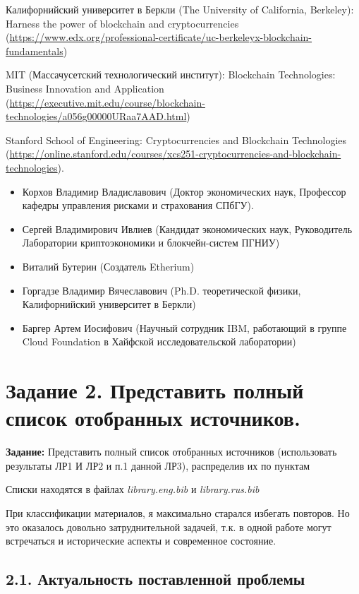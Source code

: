 \documentclass[a4paper, 12pt]{report}		%
\begin{document}
Калифорнийский университет в Беркли (The University of California, Berkeley): Harness the power of blockchain and cryptocurrencies (\url{https://www.edx.org/professional-certificate/uc-berkeleyx-blockchain-fundamentals})

MIT (Массачусетский технологический институт): Blockchain Technologies: Business Innovation and Application (\url{https://executive.mit.edu/course/blockchain-technologies/a056g00000URaa7AAD.html})

Stanford School of Engineering: Cryptocurrencies and Blockchain Technologies (\url{https://online.stanford.edu/courses/xcs251-cryptocurrencies-and-blockchain-technologies}).

\begin{itemize}
\item Корхов Владимир Владиславович (Доктор экономических наук, Профессор кафедры управления рисками и страхования СПбГУ).
\item Сергей Владимирович Ивлиев (Кандидат экономических наук, Руководитель Лаборатории криптоэкономики и блокчейн-систем ПГНИУ)
\item Виталий Бутерин (Создатель Etherium)
\item Горгадзе Владимир Вячеславович (Ph.D. теоретической физики, Калифорнийский университет в Беркли)
\item Баргер Артем Иосифович (Научный сотрудник IBM, работающий в группе Cloud Foundation в Хайфской исследовательской лаборатории)
\end{itemize}

\chapter*{Задание 2. Представить полный список отобранных источников.}

\textbf{Задание:} Представить полный список отобранных источников (использовать результаты ЛР1 И ЛР2 и п.1 данной ЛР3), распределив их по пунктам

Списки находятся в файлах \textit{library.eng.bib} и \textit{library.rus.bib}

При классификации материалов, я максимально старался избегать повторов. Но это оказалось довольно затруднительной задачей, т.к. в одной работе могут встречаться и исторические аспекты и современное состояние.


\section*{2.1. Актуальность поставленной проблемы}
\end{document}
